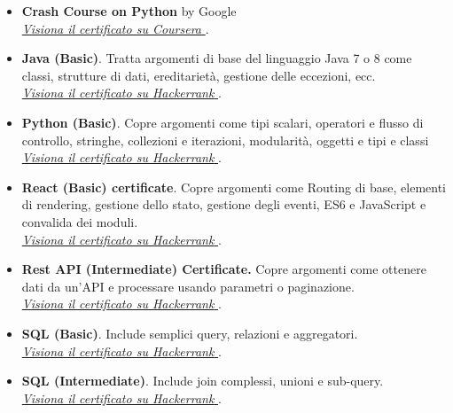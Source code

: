 \begin{itemize}
\item \textbf{Crash Course on Python} by Google\\ \href{https://coursera.org/share/cd82c8c590172184167df1d3a7241d24}{\textit{Visiona il certificato su Coursera} \faExternalLink}.
\item \textbf{Java (Basic)}. Tratta argomenti di base del linguaggio Java 7 o 8 come classi, strutture di dati, ereditarietà, gestione delle eccezioni, ecc. \\
\href{https://www.hackerrank.com/certificates/21d415f74e9e}{\textit{Visiona il certificato su Hackerrank} \faExternalLink}.
\item \textbf{Python (Basic)}. Copre argomenti come tipi scalari, operatori e flusso di controllo, stringhe, collezioni e iterazioni, modularità, oggetti e tipi e classi\\ 
\href{https://www.hackerrank.com/certificates/8aefe3cb8512}{\textit{Visiona il certificato su Hackerrank} \faExternalLink}.
\item \textbf{React (Basic) certificate}. Copre argomenti come Routing di base, elementi di rendering, gestione dello stato, gestione degli eventi, ES6 e JavaScript e convalida dei moduli.\\ \href{https://www.hackerrank.com/certificates/53766ba3aa6e}{\textit{Visiona il certificato su Hackerrank} \faExternalLink}.
\item \textbf{Rest API (Intermediate) Certificate.} Copre argomenti come ottenere dati da un'API e processare usando parametri o paginazione.\\ \href{https://www.hackerrank.com/certificates/da2ef642295f}{\textit{Visiona il certificato su Hackerrank} \faExternalLink}.
\item \textbf{SQL (Basic)}. Include semplici query, relazioni e aggregatori. \\ \href{https://www.hackerrank.com/certificates/1f2cef07410b}{\textit{Visiona il certificato su Hackerrank} \faExternalLink}.
\item \textbf{SQL (Intermediate)}. Include join complessi, unioni e sub-query.\\ \href{https://www.hackerrank.com/certificates/127fe801740d}{\textit{Visiona il certificato su Hackerrank} \faExternalLink}.
\end{itemize}







